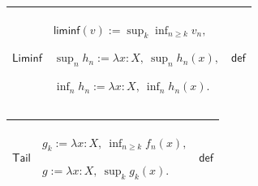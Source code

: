\documentclass[11pt]{amsart}
\newlength{\FTCThreeColumnBody}
\begin{document}
{\begin{tabular}{|@{}>{\centering\arraybackslash}m{0.251968\FTCThreeColumnBody}|>{\centering\arraybackslash}m{0.590551\FTCThreeColumnBody}|>{\centering\arraybackslash}m{0.157480\FTCThreeColumnBody}|}
\end{tabular}%
\par\setlength{\parskip}{0pt}\nointerlineskip
\noindent
\begin{tabular}{|@{}>{\centering\arraybackslash}m{0.251968\FTCThreeColumnBody}|>{\centering\arraybackslash}m{0.590551\FTCThreeColumnBody}|>{\centering\arraybackslash}m{0.157480\FTCThreeColumnBody}|}\hline
\hypertarget{def:Liminf}{$\displaystyle \textsf{Liminf}$} & $\displaystyle \textsf{liminf}(v):=\sup_k\inf_{n\ge k}v_n,$\par
$\displaystyle \sup_nh_n:=\lambda x:X,\ \sup_nh_n(x),$\par
$\displaystyle \inf_nh_n:=\lambda x:X,\ \inf_nh_n(x).$ & $\displaystyle \textsf{def}$\\ \hline
\end{tabular}%
\par\setlength{\parskip}{0pt}\nointerlineskip
\noindent
\begin{tabular}{|@{}>{\centering\arraybackslash}m{0.251968\FTCThreeColumnBody}|>{\centering\arraybackslash}m{0.590551\FTCThreeColumnBody}|>{\centering\arraybackslash}m{0.157480\FTCThreeColumnBody}|}\hline
\hypertarget{def:Tail}{$\displaystyle \textsf{Tail}$} & $\displaystyle g_k:=\lambda x:X,\ \inf_{n\ge k}f_n(x),$\par
$\displaystyle g:=\lambda x:X,\ \sup_k g_k(x).$ & $\displaystyle \textsf{def}$\\ \hline
\end{tabular}%
\par
}
\end{document}
